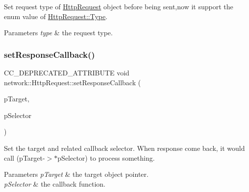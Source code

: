 Set request type of \hyperlink{classnetwork_1_1HttpRequest}{Http\+Request} object before being sent,now it support the enum value of \hyperlink{classnetwork_1_1HttpRequest_abcc6d7ee2ea91a721d32fd6d396743fe}{Http\+Request\+::\+Type}.


\begin{DoxyParams}{Parameters}
{\em type} & the request type. \\
\hline
\end{DoxyParams}
\mbox{\label{classnetwork_1_1HttpRequest_a24620015312b35c28a9cb5300d969393}} 
\subsubsection{\texorpdfstring{set\+Response\+Callback()}{setResponseCallback()}\hspace{0.1cm}{\footnotesize\ttfamily [1/6]}}
{\footnotesize\ttfamily C\+C\+\_\+\+D\+E\+P\+R\+E\+C\+A\+T\+E\+D\+\_\+\+A\+T\+T\+R\+I\+B\+U\+TE void network\+::\+Http\+Request\+::set\+Response\+Callback (\begin{DoxyParamCaption}\item[{\hyperlink{classRef}{Ref} $\ast$}]{p\+Target,  }\item[{S\+E\+L\+\_\+\+Call\+Func\+ND}]{p\+Selector }\end{DoxyParamCaption})\hspace{0.3cm}{\ttfamily [inline]}}

Set the target and related callback selector. When response come back, it would call (p\+Target-\/$>$$\ast$p\+Selector) to process something.


\begin{DoxyParams}{Parameters}
{\em p\+Target} & the target object pointer. \\
\hline
{\em p\+Selector} & the callback function. \\
\hline
\end{DoxyParams}
\mbox{\label{classnetwork_1_1HttpRequest_a24620015312b35c28a9cb5300d969393}} 
